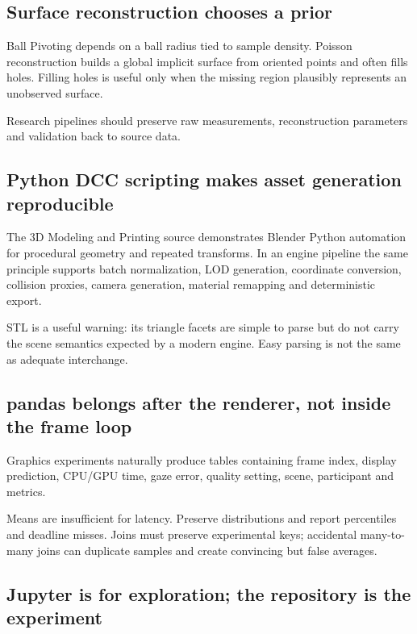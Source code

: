 \subsection{Surface reconstruction chooses a prior}\label{04-visual-computing-ii-ch035-surface-reconstruction-chooses-a-prior}

Ball Pivoting depends on a ball radius tied to sample density. Poisson reconstruction builds a global implicit surface from oriented points and often fills holes. Filling holes is useful only when the missing region plausibly represents an unobserved surface.

Research pipelines should preserve raw measurements, reconstruction parameters and validation back to source data.

\subsection{Python DCC scripting makes asset generation reproducible}\label{04-visual-computing-ii-ch035-python-dcc-scripting-makes-asset-generation-reproducible}

The 3D Modeling and Printing source demonstrates Blender Python automation for procedural geometry and repeated transforms. In an engine pipeline the same principle supports batch normalization, LOD generation, coordinate conversion, collision proxies, camera generation, material remapping and deterministic export.

STL is a useful warning: its triangle facets are simple to parse but do not carry the scene semantics expected by a modern engine. Easy parsing is not the same as adequate interchange.

\subsection{pandas belongs after the renderer, not inside the frame loop}\label{04-visual-computing-ii-ch035-pandas-belongs-after-the-renderer-not-inside-the-frame-loop}

Graphics experiments naturally produce tables containing frame index, display prediction, CPU/GPU time, gaze error, quality setting, scene, participant and metrics.

Means are insufficient for latency. Preserve distributions and report percentiles and deadline misses. Joins must preserve experimental keys; accidental many-to-many joins can duplicate samples and create convincing but false averages.

\subsection{Jupyter is for exploration; the repository is the experiment}\label{04-visual-computing-ii-ch035-jupyter-is-for-exploration-the-repository-is-the-experiment}

